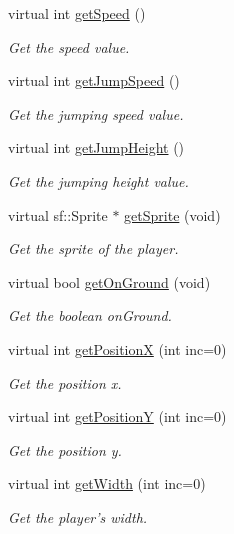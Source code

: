 \begin{DoxyCompactItemize}
virtual int \hyperlink{class_player_a5755be9818f6f911d9494e4948d8c483}{get\-Speed} ()
\begin{DoxyCompactList}\small\item\em Get the speed value. \end{DoxyCompactList}\item 
virtual int \hyperlink{class_player_a95676c9d2da2c6e778aa8558c5e5fa80}{get\-Jump\-Speed} ()
\begin{DoxyCompactList}\small\item\em Get the jumping speed value. \end{DoxyCompactList}\item 
virtual int \hyperlink{class_player_a4df8845cc35f7ef2d8aefbeffb141aed}{get\-Jump\-Height} ()
\begin{DoxyCompactList}\small\item\em Get the jumping height value. \end{DoxyCompactList}\item 
virtual sf\-::\-Sprite $\ast$ \hyperlink{class_player_adbce087693a5623afac017735d67a39d}{get\-Sprite} (void)
\begin{DoxyCompactList}\small\item\em Get the sprite of the player. \end{DoxyCompactList}\item 
virtual bool \hyperlink{class_player_a79eac778dc97f959fd3f82e7807b54af}{get\-On\-Ground} (void)
\begin{DoxyCompactList}\small\item\em Get the boolean on\-Ground. \end{DoxyCompactList}\item 
virtual int \hyperlink{class_player_af80fb70e7b808f24192b49ca0f5656f0}{get\-Position\-X} (int inc=0)
\begin{DoxyCompactList}\small\item\em Get the position x. \end{DoxyCompactList}\item 
virtual int \hyperlink{class_player_a04dfb18ee251361671bad38cf0d42a4a}{get\-Position\-Y} (int inc=0)
\begin{DoxyCompactList}\small\item\em Get the position y. \end{DoxyCompactList}\item 
virtual int \hyperlink{class_player_a758ed6885202cac4e51e9022c1371afa}{get\-Width} (int inc=0)
\begin{DoxyCompactList}\small\item\em Get the player's width. \end{DoxyCompactList}\item 

\end{DoxyCompactItemize}
